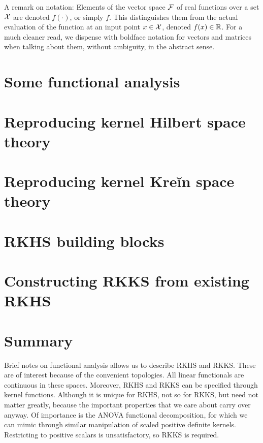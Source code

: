 \documentclass[a4paper,showframe,11pt,draft]{report}
\begin{document}
A remark on notation: Elements of the vector space ${\mathcal F}$ of real functions over a set ${\mathcal X}$ are denoted $f(\cdot)$, or simply $f$.
This distinguishes them from the actual evaluation of the function at an input point $x \in {\mathcal X}$, denoted $f(x) \in \mathbb{R}$.
For a much cleaner read, we dispense with boldface notation for vectors and matrices when talking about them, without ambiguity, in the abstract sense. 

\section{Some functional analysis}


\section{Reproducing kernel Hilbert space theory}\label{sec:rkhstheory}


\section{Reproducing kernel Kreĭn space theory}


\section{RKHS building blocks}


\section{Constructing RKKS from existing RKHS}


\section{Summary}

Brief notes on functional analysis allows us to describe RKHS and RKKS.
These are of interest because of the convenient topologies.
All linear functionals are continuous in these spaces.
Moreover, RKHS and RKKS can be specified through kernel functions.
Although it is unique for RKHS, not so for RKKS, but need not matter greatly, because the important properties that we care about carry over anyway.
Of importance is the ANOVA functional decomposition, for which we can mimic through similar manipulation of scaled positive definite kernels.
Restricting to positive scalars is unsatisfactory, so RKKS is required.


\hClosingStuffStandalone
\end{document}
